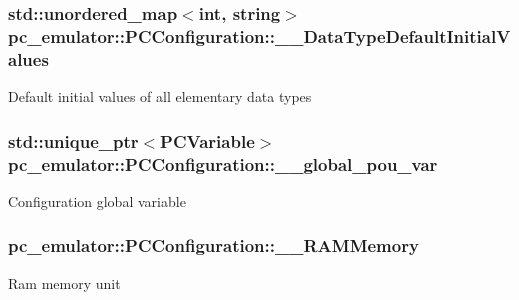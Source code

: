 \subsubsection[{\texorpdfstring{\+\_\+\+\_\+\+Data\+Type\+Default\+Initial\+Values}{__DataTypeDefaultInitialValues}}]{\setlength{\rightskip}{0pt plus 5cm}std\+::unordered\+\_\+map$<$int, string$>$ pc\+\_\+emulator\+::\+P\+C\+Configuration\+::\+\_\+\+\_\+\+Data\+Type\+Default\+Initial\+Values}\hypertarget{classpc__emulator_1_1PCConfiguration_a008356e12ada7e9458284264c41bed79}{}\label{classpc__emulator_1_1PCConfiguration_a008356e12ada7e9458284264c41bed79}
Default initial values of all elementary data types 
\subsubsection[{\texorpdfstring{\+\_\+\+\_\+global\+\_\+pou\+\_\+var}{__global_pou_var}}]{\setlength{\rightskip}{0pt plus 5cm}std\+::unique\+\_\+ptr$<${\bf P\+C\+Variable}$>$ pc\+\_\+emulator\+::\+P\+C\+Configuration\+::\+\_\+\+\_\+global\+\_\+pou\+\_\+var}\hypertarget{classpc__emulator_1_1PCConfiguration_ad066e891499d290b4334d550f54293b6}{}\label{classpc__emulator_1_1PCConfiguration_ad066e891499d290b4334d550f54293b6}
Configuration global variable 
\subsubsection[{\texorpdfstring{\+\_\+\+\_\+\+R\+A\+M\+Memory}{__RAMMemory}}]{ pc\+\_\+emulator\+::\+P\+C\+Configuration\+::\+\_\+\+\_\+\+R\+A\+M\+Memory}\hypertarget{classpc__emulator_1_1PCConfiguration_aa77e2c4da7cd2f0fd128402618a9400a}{}\label{classpc__emulator_1_1PCConfiguration_aa77e2c4da7cd2f0fd128402618a9400a}
Ram memory unit 
